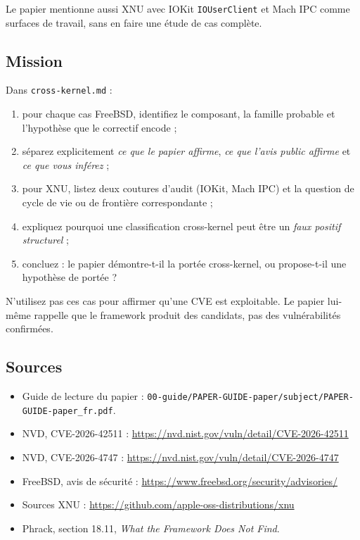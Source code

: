 \documentclass{training}
\begin{document}
Le papier mentionne aussi XNU avec IOKit \texttt{IOUserClient} et Mach IPC
comme surfaces de travail, sans en faire une étude de cas complète.

\subsection*{Mission}

Dans \texttt{cross-kernel.md} :

\begin{enumerate}
  \item pour chaque cas FreeBSD, identifiez le composant, la famille
        probable et l'hypothèse que le correctif encode ;
  \item séparez explicitement \emph{ce que le papier affirme}, \emph{ce que
        l'avis public affirme} et \emph{ce que vous inférez} ;
  \item pour XNU, listez deux coutures d'audit (IOKit, Mach IPC) et la
        question de cycle de vie ou de frontière correspondante ;
  \item expliquez pourquoi une classification cross-kernel peut être un
        \emph{faux positif structurel} ;
  \item concluez : le papier démontre-t-il la portée cross-kernel, ou
        propose-t-il une hypothèse de portée ?
\end{enumerate}

\begin{warn}
N'utilisez pas ces cas pour affirmer qu'une CVE est exploitable. Le papier
lui-même rappelle que le framework produit des candidats, pas des
vulnérabilités confirmées.
\end{warn}

\subsection*{Sources}
\begin{itemize}
  \item Guide de lecture du papier :
        \texttt{00-guide/PAPER-GUIDE-paper/subject/PAPER-GUIDE-paper\_fr.pdf}.
  \item NVD, CVE-2026-42511 :
        \url{https://nvd.nist.gov/vuln/detail/CVE-2026-42511}
  \item NVD, CVE-2026-4747 :
        \url{https://nvd.nist.gov/vuln/detail/CVE-2026-4747}
  \item FreeBSD, avis de sécurité :
        \url{https://www.freebsd.org/security/advisories/}
  \item Sources XNU :
        \url{https://github.com/apple-oss-distributions/xnu}
  \item Phrack, section 18.11, \emph{What the Framework Does Not Find}.
\end{itemize}
\end{document}
